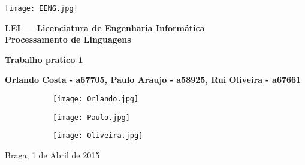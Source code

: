 \begin{titlepage}
\begin{center}

\begin{flushleft}
\texttt{[image: EENG.jpg]}\\
\end{flushleft}

\vspace{1.5cm}

\Large{\textbf{LEI --- Licenciatura de Engenharia Informática}}\\
\vspace{1cm}
\Large{\textbf{Processamento de Linguagens}}\\

\vspace{1cm}

\Huge{\textbf{Trabalho pratico 1}} \\

\vspace{2cm}

\Large{\textbf{Orlando Costa -  a67705, Paulo Araujo - a58925, Rui Oliveira - a67661}}\\
\begin{figure}[h]
\centering
\begin{subfigure}{.3\textwidth}
  \centering
  \texttt{[image: Orlando.jpg]}
\end{subfigure}
\begin{subfigure}{.3\textwidth}
  \centering
  \texttt{[image: Paulo.jpg]}
\end{subfigure}
\begin{subfigure}{.3\textwidth}
  \centering
  \texttt{[image: Oliveira.jpg]}
\end{subfigure}
\end{figure}

\vspace{1.5cm}
Braga, 1 de Abril de 2015

\end{center}

\end{titlepage}
